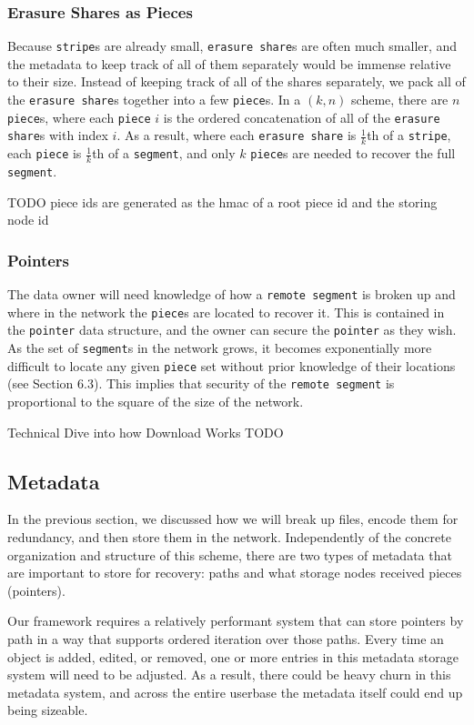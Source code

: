 \documentclass[a4paper,10pt]{article} \usepackage[utf8]{inputenc}
\newcommand{\x}[1]{{\tt #1}} \newcommand{\code}[1]{{\tt #1}}
\newcommand{\todo}[1]{{\color{red} TODO #1 }}
\begin{document}
\subsubsection{Erasure Shares as Pieces}

Because \x{stripe}s are already small, \x{erasure share}s are often much
smaller, and the metadata to keep track of all of them separately would be
immense relative to their size. Instead of keeping track of all of the shares
separately, we pack all of the \x{erasure share}s together into a few
\x{piece}s. In a $(k, n)$ scheme, there are $n$ \x{piece}s, where each
\x{piece} $i$ is the ordered concatenation of all of the \x{erasure share}s with
index $i$. As a result, where each \x{erasure share} is $\frac{1}{k}$th of a
\x{stripe}, each \x{piece} is $\frac{1}{k}$th of a \x{segment}, and only $k$
\x{piece}s are needed to recover the full \x{segment}.

\todo{piece ids are generated as the hmac of a root piece id and the storing
node id}

\subsubsection{Pointers}

The data owner will need knowledge of how a \x{remote segment} is broken up and
where in the network the \x{piece}s are located to recover it. This is contained
in the \x{pointer} data structure, and the owner can secure the \x{pointer} as
they wish. As the set of \x{segment}s in the network grows, it becomes
exponentially more difficult to locate any given \x{piece} set without prior
knowledge of their locations (see Section 6.3). This implies that security of
the \x{remote segment} is proportional to the square of the size of the network.


Technical Dive into how Download Works
\todo{}

\subsection{Metadata}

In the previous section, we discussed how we will break up files, encode them
for redundancy, and then store them in the network. Independently of the
concrete organization and structure of this scheme, there are two types of
metadata that are important to store for recovery: paths and what
storage nodes received pieces (pointers).

Our framework requires a relatively performant system that can store pointers by
path in a way that supports ordered iteration over those paths. Every time an
object is added, edited, or removed, one or more entries in this metadata
storage system will need to be adjusted. As a result, there could be heavy churn
in this metadata system, and across the entire userbase the metadata itself
could end up being sizeable.
\end{document}
